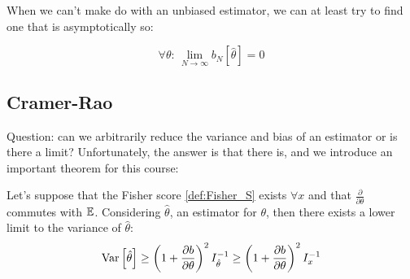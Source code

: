 When we can't make do with an unbiased estimator, we can at least try to find one that is asymptotically so:

	\[
	\forall \theta:\, \lim_{N\to\infty}b_N\left[\hat\theta\right]=0
	\]

\subsection{Cramer-Rao}
\label{subsubsec:CR}

Question: can we arbitrarily reduce the variance and bias of an estimator or is there a limit? Unfortunately, the answer is that there is, and we introduce an important theorem for this course:

\begin{theorem}
	Let's suppose that the Fisher score \ref{def:Fisher_S} exists $\forall x$ and that $\frac{\partial}{\partial\theta}$ commutes with $\mathbb{E}$. Considering $\hat\theta$, an estimator for $\theta$, then there exists a lower limit to the variance of $\hat\theta$:
	\[
	\operatorname{Var}\left[\hat\theta\right]\geq \left(1+\frac{\partial b}{\partial\theta}\right)^2 I_{\hat\theta}^{-1} \geq \left(1+\frac{\partial b}{\partial\theta}\right)^2 I_{x}^{-1}
	\]
\label{def:cramer-rao}
\end{theorem}


